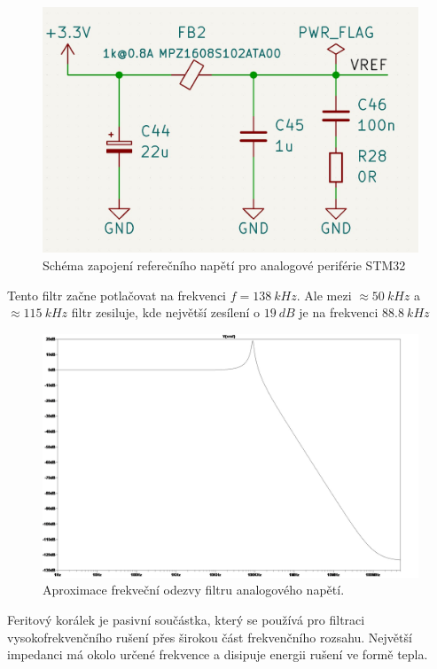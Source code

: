 \begin{figure}[H]
    \centering
    \includegraphics[width=1\linewidth]{pictures/stm_analog_reference.jpg}
    \caption{Schéma zapojení referečního napětí pro analogové periférie STM32}
    \label{fig:stm32_vref}
\end{figure}

Tento filtr začne potlačovat na frekvenci $f = 138 \ kHz$. Ale mezi $\approx 50 \ kHz$ a $ \approx 115 \ kHz$ filtr zesiluje, kde největší zesílení o $19 \ dB$ je na frekvenci $88.8 \ kHz$

\begin{figure}[H]
    \centering
    \includegraphics[width=1\linewidth]{pictures/cardi_vref_filter_response.jpg}
    \caption{Aproximace frekveční odezvy filtru analogového napětí.}
    \label{fig:stm32_vref_response}
\end{figure}

Feritový korálek je pasivní součástka, který se používá pro filtraci vysokofrekvenčního rušení přes širokou část frekvenčního rozsahu. Největší impedanci má okolo určené frekvence a disipuje energii rušení ve formě tepla.
